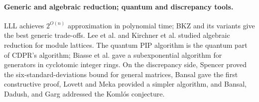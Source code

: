 \documentclass[11pt,a4paper]{article}
\theoremstyle{plain}
\theoremstyle{definition}
\theoremstyle{remark}
\begin{document}
\paragraph{Generic and algebraic reduction; quantum and discrepancy tools.} LLL \cite{LLL82} achieves $2^{O(n)}$ approximation in polynomial time; BKZ \cite{Schnorr87,SE94} and its variants \cite{GN08,ADRS15,AGVW17} give the best generic trade-offs. Lee et al. \cite{LLPS19} and Kirchner et al.  \cite{KEF20} studied algebraic reduction for module lattices. The quantum PIP algorithm \cite{BiasseSong16,EHKS14} is the quantum part of CDPR's algorithm; Biasse et al. \cite{BEGFK20} gave a subexponential algorithm for generators in cyclotomic integer rings. On the discrepancy side, Spencer \cite{Spencer85} proved the six-standard-deviations bound for general matrices, Bansal \cite{Bansal10} gave the first constructive proof, Lovett and Meka \cite{LM15} provided a simpler algorithm, and Bansal, Dadush, and Garg \cite{BDG19} addressed the Koml\'os conjecture.
\end{document}
